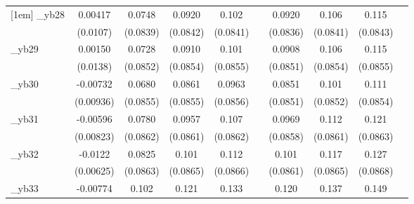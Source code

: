 \begin{table}[htbp]
\begin{tabular}{l*{9}{c}}
[1em]
\_yb28       &     0.00417         &      0.0748         &      0.0920         &       0.102         &                     &      0.0920         &       0.106         &       0.115         &                     \\
            &    (0.0107)         &    (0.0839)         &    (0.0842)         &    (0.0841)         &                     &    (0.0836)         &    (0.0841)         &    (0.0843)         &                     \\
[1em]
\_yb29       &     0.00150         &      0.0728         &      0.0910         &       0.101         &                     &      0.0908         &       0.106         &       0.115         &                     \\
            &    (0.0138)         &    (0.0852)         &    (0.0854)         &    (0.0855)         &                     &    (0.0851)         &    (0.0854)         &    (0.0855)         &                     \\
[1em]
\_yb30       &    -0.00732         &      0.0680         &      0.0861         &      0.0963         &                     &      0.0851         &       0.101         &       0.111         &                     \\
            &   (0.00936)         &    (0.0855)         &    (0.0855)         &    (0.0856)         &                     &    (0.0851)         &    (0.0852)         &    (0.0854)         &                     \\
[1em]
\_yb31       &    -0.00596         &      0.0780         &      0.0957         &       0.107         &                     &      0.0969         &       0.112         &       0.121         &                     \\
            &   (0.00823)         &    (0.0862)         &    (0.0861)         &    (0.0862)         &                     &    (0.0858)         &    (0.0861)         &    (0.0863)         &                     \\
[1em]
\_yb32       &     -0.0122\sym{*}  &      0.0825         &       0.101         &       0.112         &                     &       0.101         &       0.117         &       0.127         &                     \\
            &   (0.00625)         &    (0.0863)         &    (0.0865)         &    (0.0866)         &                     &    (0.0861)         &    (0.0865)         &    (0.0868)         &                     \\
[1em]
\_yb33       &    -0.00774         &       0.102         &       0.121         &       0.133         &                     &       0.120         &       0.137         &       0.149\sym{*}  &                     \\

\end{tabular}
\end{table}
